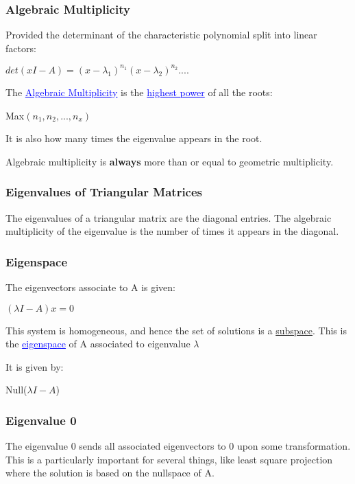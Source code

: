 \documentclass{article}
\newcommand{\bul}[1]{\textcolor{blue}{\underline{#1}}}
\newcommand{\sbreak}{\vspace{10pt}}
\begin{document}
\subsubsection{Algebraic Multiplicity}
Provided the determinant of the characteristic polynomial split into linear factors:
\begin{center}
    $det(xI-A) = (x-\lambda_1)^{n_1} (x-\lambda_2)^{n_2} ....$
\end{center}
The \bul{Algebraic Multiplicity} is the \bul{highest power} of all the roots:
\begin{center}
    Max$(n_1, n_2, ..., n_x)$
\end{center}

It is also how many times the eigenvalue appears in the root.

\sbreak

Algebraic multiplicity is \textbf{always} more than or equal to geometric multiplicity.

\subsubsection{Eigenvalues of Triangular Matrices}
The eigenvalues of a triangular matrix are the diagonal entries. The algebraic multiplicity of the eigenvalue is the number of times it appears in the diagonal.

\subsubsection{Eigenspace}
The eigenvectors associate to A is given:
\begin{center}
    $(\lambda I - A)x =0$
\end{center}
This system is homogeneous, and hence the set of solutions is a \underline{subspace}. This is the \bul{eigenspace} of A associated to eigenvalue $\lambda$

It is given by:
\begin{center}
    Null($\lambda I - A$)
\end{center}

\subsubsection{Eigenvalue 0}
The eigenvalue 0 sends all associated eigenvectors to 0 upon some transformation. This is a particularly important for several things, like least square projection where the solution is based on the nullspace of A.
\end{document}
